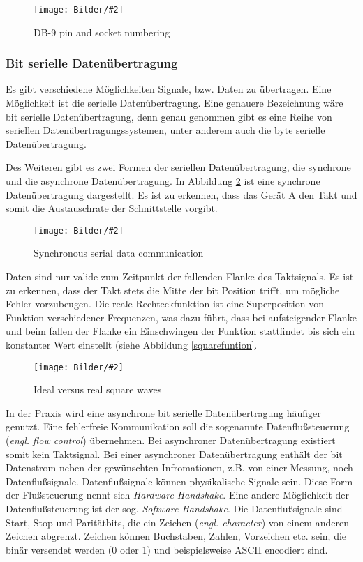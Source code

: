 \documentclass[
fontsize=12pt, 
paper=a4, 
BCOR=10mm, 
twoside=false,
 DIV=10, 
 headsepline, 
 footsepline
 ]{scrartcl}
\def\bild#1#2#3#4#5#6{%
\begin{figure}[h!] %
\centering
\texttt{[image: Bilder/\#2]}
\vspace{#3}
\caption[#4]{#5}\label{#6}
\end{figure}
}
\begin{document}
\bild{1}
{db9_male-female.png}
{0em}
{DB-9 pin and socket numbering}
{DB-9 pin and socket numbering \cite[S. 211]{hughes2010real}}
{db9_male-female}



\subsubsection{Bit serielle Datenübertragung}

Es gibt verschiedene Möglichkeiten Signale, bzw. Daten zu übertragen. Eine Möglichkeit ist die serielle Datenübertragung. Eine genauere Bezeichnung wäre bit serielle Datenübertragung, denn genau genommen gibt es eine Reihe von seriellen Datenübertragungssystemen, unter anderem auch die byte serielle Datenübertragung. 


Des Weiteren gibt es zwei Formen der seriellen Datenübertragung, die synchrone und die asynchrone Datenübertragung. In Abbildung \ref{seriallio} ist eine synchrone Datenübertragung dargestellt. Es ist zu erkennen, dass das Gerät A den Takt und somit die Austauschrate der Schnittstelle vorgibt.

\bild{0.8}
{serielle_datenuebertragung.png}
{-0.5em}
{Synchronous serial data communication}
{Synchronous serial data communication \cite[S. 52]{hughes2010real}}
{seriallio}

Daten sind nur valide zum Zeitpunkt der fallenden Flanke des Taktsignals. Es ist zu erkennen, dass der Takt stets die Mitte der bit Position trifft, um mögliche Fehler vorzubeugen. Die \glqq reale\grqq{} Rechteckfunktion ist eine Superposition von Funktion verschiedener Frequenzen, was dazu führt, dass bei aufsteigender Flanke und beim fallen der Flanke ein Einschwingen der Funktion stattfindet bis sich ein konstanter Wert einstellt (siehe Abbildung \ref{squarefuntion}.

\bild{0.9}
{square_waves.png}
{0em}
{Ideal versus real square waves}
{Ideal versus real square waves \cite[S. 5]{hughes2010real}}
{squarefunction}

In der Praxis wird eine asynchrone bit serielle Datenübertragung häufiger genutzt. Eine fehlerfreie Kommunikation soll die sogenannte Datenflußsteuerung (\textit{engl. flow control}) übernehmen. Bei asynchroner Datenübertragung existiert somit kein Taktsignal. Bei einer asynchroner Datenübertragung enthält der bit Datenstrom neben der \glqq gewünschten\grqq{} Infromationen, z.B. von einer Messung, noch Datenflußsignale. Datenflußsignale können physikalische Signale sein. Diese Form der Flußsteuerung nennt sich \textit{Hardware-Handshake}.
Eine andere Möglichkeit der Datenflußsteuerung ist der sog. \textit{Software-Handshake}. Die Datenflußsignale sind Start, Stop und Paritätbits, die ein Zeichen (\textit{engl. character}) von einem anderen Zeichen abgrenzt. Zeichen können Buchstaben, Zahlen, Vorzeichen etc. sein, die binär versendet werden (0 oder 1) und beispielsweise ASCII encodiert sind.
\end{document}
